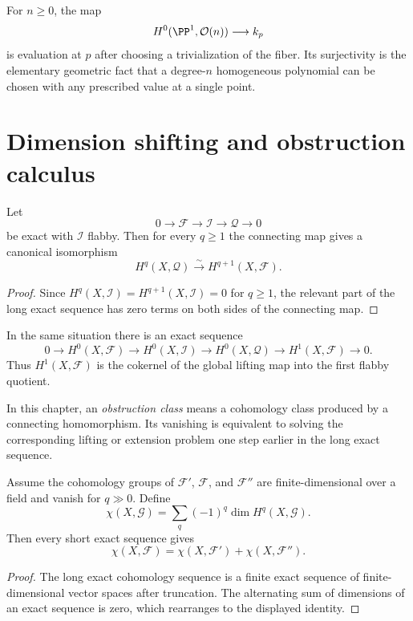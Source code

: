 \begin{example}\label{ex:vi48-skyscraper-evaluation}
For $n\ge0$, the map
\[
H^0(\PP^1,\mathcal O(n))\longrightarrow k_p
\]
is evaluation at $p$ after choosing a trivialization of the fiber.  Its surjectivity is the elementary geometric fact that a degree-$n$ homogeneous polynomial can be chosen with any prescribed value at a single point.
\end{example}

\section{Dimension shifting and obstruction calculus}

\begin{proposition}\label{prop:vi48-dimension-shift}
Let
\[
0\to\mathcal F\to\mathcal I\to\mathcal Q\to0
\]
be exact with $\mathcal I$ flabby.  Then for every $q\ge1$ the connecting map gives a canonical isomorphism
\[
H^q(X,\mathcal Q)\xrightarrow{\sim}H^{q+1}(X,\mathcal F).
\]
\begin{proof}
Since $H^q(X,\mathcal I)=H^{q+1}(X,\mathcal I)=0$ for $q\ge1$, the relevant part of the long exact sequence has zero terms on both sides of the connecting map.
\end{proof}
\end{proposition}

\begin{corollary}\label{cor:vi48-dimension-shift-h1}
In the same situation there is an exact sequence
\[
0\to H^0(X,\mathcal F)\to H^0(X,\mathcal I)\to H^0(X,\mathcal Q)
\to H^1(X,\mathcal F)\to0.
\]
Thus $H^1(X,\mathcal F)$ is the cokernel of the global lifting map into the first flabby quotient.
\end{corollary}

\begin{definition}\label{def:vi48-obstruction}
In this chapter, an \emph{obstruction class} means a cohomology class produced by a connecting homomorphism.  Its vanishing is equivalent to solving the corresponding lifting or extension problem one step earlier in the long exact sequence.
\end{definition}

\begin{proposition}\label{prop:vi48-euler-additivity}
Assume the cohomology groups of $\mathcal F'$, $\mathcal F$, and $\mathcal F''$ are finite-dimensional over a field and vanish for $q\gg0$.  Define
\[
\chi(X,\mathcal G)=\sum_q(-1)^q\dim H^q(X,\mathcal G).
\]
Then every short exact sequence gives
\[
\chi(X,\mathcal F)=\chi(X,\mathcal F')+\chi(X,\mathcal F'').
\]
\begin{proof}
The long exact cohomology sequence is a finite exact sequence of finite-dimensional vector spaces after truncation.  The alternating sum of dimensions of an exact sequence is zero, which rearranges to the displayed identity.
\end{proof}
\end{proposition}

